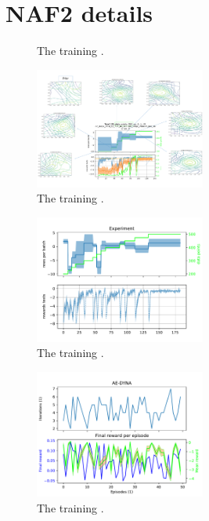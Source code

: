 \documentclass[
 reprint,
 amsmath,amssymb,amsfonts,clevref,
 aps,
prstab,
]{revtex4-2}
\begin{document}
\appendix
\section{NAF2 details}\label{appendix:pernaf}

\begin{figure}[!h]
  \centering
  
  \caption{The training .}
  \label{fig:comparsion_per}
\end{figure}


\begin{figure}[!h]
  \centering
  \includegraphics*[width=0.5\textwidth]{Figures/Learning_evolution}
  \caption{The training .}
  \label{fig:comparsion_per}
\end{figure}

\begin{figure}[!h]
  \centering
  \includegraphics*[width=0.5\textwidth]{Figures/AE-DYNA_observables.pdf}
  \caption{The training .}
  \label{fig:comparsion_per}
\end{figure}

\begin{figure}[!h]
  \centering
  \includegraphics*[width=0.5\textwidth]{Figures/AE-DYNA_verification.pdf}
  \caption{The training .}
  \label{fig:comparsion_per}
\end{figure}
\end{document}
